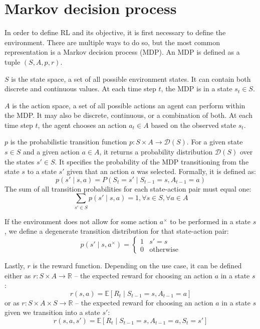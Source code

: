 \documentclass[
  digital,     %
  oneside,     %
  nosansbold,  %
  nocolorbold, %
  lof,         %
  lot,         %
]{fithesis4}
\begin{document}
\section{Markov decision process}
In order to define RL and its objective, it is first necessary to define the environment. There are multiple ways to do so, but the most common representation is a Markov decision process (MDP). An MDP is defined as a tuple $(S, A, p, r)$.

$S$ is the state space, a set of all possible environment states. It can contain both discrete and continuous values. At each time step $t$, the MDP is in a state $s_t\in S$.

$A$ is the action space, a set of all possible actions an agent can perform within the MDP. It may also be discrete, continuous, or a combination of both. At each time step $t$, the agent chooses an action $a_t\in A$ based on the observed state $s_t$.

$p$ is the probabilistic transition function $p\colon S \times A \to \mathcal{D}(S)$. For a given state $s\in S$ and a given action $a\in A$, it returns a probability distribution $\mathcal{D}(S)$ over the states $s'\in S$. It specifies the probability of the MDP transitioning from the state $s$ to a state $s'$ given that an action $a$ was selected. Formally, it is defined as:
\begin{equation}
p(s' \mid s,a)=P(S_t=s'\mid S_{t-1}=s,A_{t-1}=a)    
\end{equation}
The sum of all transition probabilities for each state-action pair must equal one:
\begin{equation}
\sum_{s'\in S} p(s'\mid s,a)=1, \forall s \in S, \forall a \in A
\end{equation}

If the environment does not allow for some action $a^{\times}$ to be performed in a state $s$, we define a degenerate transition distribution for that state-action pair:
\begin{equation}
    p(s'\mid s, a^{\times}) =\begin{cases}1 & s' = s\\0 & \text{otherwise} \end{cases} 
\end{equation}

Lastly, $r$ is the reward function. Depending on the use case, it can be defined either as $r\colon S \times A \to \mathbb{R}$ -- the expected reward for choosing an action $a$ in a state $s$ \cite{PA230}:
\begin{equation}
r(s,a)= \mathbb{E} [R_t\mid S_{t-1}=s, A_{t-1}=a]
\end{equation}
or as $r\colon S\times A \times S \to \mathbb{R}$ -- the expected reward for choosing an action $a$ in a state $s$ given we transition into a state $s'$:
\begin{equation}
r(s, a, s')= \mathbb{E} [R_t\mid S_{t-1}=s, A_{t-1}=a, S_t=s']
\end{equation}
\end{document}
